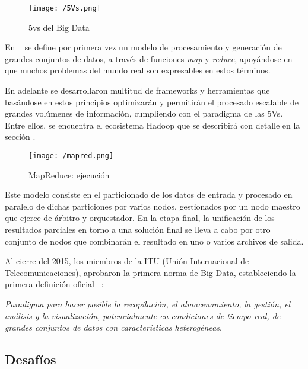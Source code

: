 \begin{figure}[!h]
  \begin{center}
    \texttt{[image: /5Vs.png]} 
    \caption{5vs del Big Data}
    \label{fig:5Vs}
  \end{center}
\end{figure}

En ~\cite{map_reduce} se define por primera vez un modelo de procesamiento y
generación de grandes conjuntos de datos, a través de funciones \textit{map} y
\textit{reduce}, apoyándose en que muchos problemas del mundo real son
expresables en estos términos.

En adelante se desarrollaron multitud de frameworks y herramientas que basándose
en estos principios optimizarán y permitirán el procesado escalable de grandes
volúmenes de información, cumpliendo con el paradigma de las 5Vs. Entre ellos,
se encuentra el ecosistema Hadoop que se describirá con detalle en la sección
.

\begin{figure}[!h]
  \begin{center}
    \texttt{[image: /mapred.png]} 
    \caption{MapReduce: ejecución ~\cite{map_reduce}}
    \label{fig:mapred}
  \end{center}
\end{figure}


Este modelo consiste en el particionado de los datos de entrada y procesado en
paralelo de dichas particiones por varios nodos, gestionados por un nodo maestro
que ejerce de árbitro y orquestador. En la etapa final, la
unificación de los resultados parciales en torno a una solución final se lleva a
cabo por otro conjunto de nodos que combinarán el resultado en uno o varios
archivos de salida.

Al cierre del 2015, los miembros de la ITU (Unión Internacional de
Telecomunicaciones), aprobaron la primera norma de Big Data, estableciendo la
primera definición oficial ~\cite{ITU}:

\textit{Paradigma para hacer posible la recopilación, el almacenamiento, la
  gestión, el análisis y la visualización, potencialmente en condiciones de
  tiempo real, de grandes conjuntos de datos con características heterogéneas}.

\subsection{Desafíos}


